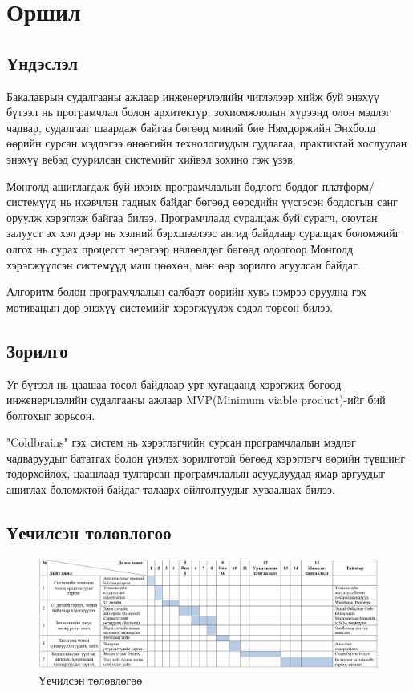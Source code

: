 \chapter{Оршил}
\section{Үндэслэл}
Бакалаврын судалгааны ажлаар инженерчлэлийн чиглэлээр хийж буй энэхүү бүтээл нь програмчлал болон архитектур, зохиомжлолын хүрээнд олон мэдлэг чадвар, судалгааг шаардаж байгаа бөгөөд миний бие Нямдоржийн Энхболд өөрийн сурсан мэдлэгээ өнөөгийн технологиудын судлагаа, практиктай хослуулан энэхүү вебэд суурилсан системийг хийвэл зохино гэж үзэв. 

Монголд ашиглагдаж буй ихэнх програмчлалын бодлого боддог платформ/системүүд нь ихэвчлэн гадных байдаг бөгөөд өөрсдийн үүсгэсэн бодлогын санг оруулж хэрэглэж байгаа билээ. Програмчлалд суралцаж буй сурагч, оюутан залууст эх хэл дээр нь хэлний бэрхшээлээс ангид байдлаар суралцах боломжийг олгох нь сурах процесст эерэгээр нөлөөлдөг бөгөөд одоогоор Монголд хэрэгжүүлсэн системүүд маш цөөхөн, мөн өөр зорилго агуулсан байдаг.

Алгоритм болон програмчлалын салбарт өөрийн хувь нэмрээ оруулна гэх мотивацын дор энэхүү системийг хэрэгжүүлэх сэдэл төрсөн билээ.

\section{Зорилго}
Уг бүтээл нь цаашаа төсөл байдлаар урт хугацаанд хэрэгжих бөгөөд инженерчлэлийн судалгааны ажлаар MVP(Minimum viable product)-ийг бий болгохыг зорьсон.

"Coldbrains" гэх систем нь хэрэглэгчийн сурсан програмчлалын мэдлэг чадваруудыг бататгах болон үнэлэх зорилготой бөгөөд хэрэглэгч өөрийн түвшинг тодорхойлох, цаашлаад тулгарсан програмчлалын асуудлуудад ямар аргуудыг ашиглах боломжтой байдаг талаарх ойлголтуудыг хуваалцах билээ.

\section{Үечилсэн төлөвлөгөө}
\begin{figure}[h]
  \centering
  \includegraphics[angle=90, width=-10cm, height=-24cm]{img/thesis-plan.PNG}
  \caption{Үечилсэн төлөвлөгөө}
\end{figure}